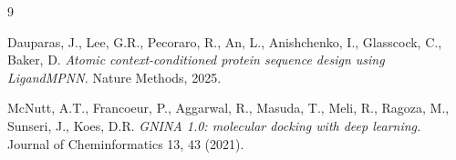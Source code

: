 \documentclass[11pt]{article}
\begin{document}
\begin{thebibliography}{9}

Dauparas, J., Lee, G.R., Pecoraro, R., An, L., Anishchenko, I., Glasscock,
C., Baker, D.
\emph{Atomic context-conditioned protein sequence design using LigandMPNN.}
Nature Methods, 2025.

McNutt, A.T., Francoeur, P., Aggarwal, R., Masuda, T., Meli, R., Ragoza,
M., Sunseri, J., Koes, D.R.
\emph{GNINA 1.0: molecular docking with deep learning.}
Journal of Cheminformatics 13, 43 (2021).

\end{thebibliography}
\end{document}
